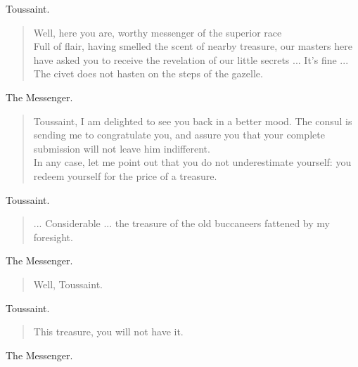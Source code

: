 \documentclass[letterpaper,article,12pt,oneside,notitlepage]{memoir}
\begin{document}
\begin{center}Toussaint.\end{center}

\begin{verse}
Well, here you are, worthy messenger of the superior race \\
Full of flair, having smelled the scent of nearby treasure, our masters here have asked you to receive the revelation of our little secrets ... It's fine ... The civet does not hasten on the steps of the gazelle. \\
\end{verse}

\begin{center}The Messenger.\end{center}

\begin{verse}
Toussaint, I am delighted to see you back in a better mood. The consul is sending me to congratulate you, and assure you that your complete submission will not leave him indifferent. \\
In any case, let me point out that you do not underestimate yourself: you redeem yourself for the price of a treasure. \\
\end{verse}

\begin{center}Toussaint.\end{center}

\begin{verse}
... Considerable ... the treasure of the old buccaneers fattened by my foresight. \\
\end{verse}

\begin{center}The Messenger.\end{center}

\begin{verse}
Well, Toussaint. \\
\end{verse}

\begin{center}Toussaint.\end{center}

\begin{verse}
This treasure, you will not have it. \\
\end{verse}

\begin{center}The Messenger.\end{center}
\end{document}
